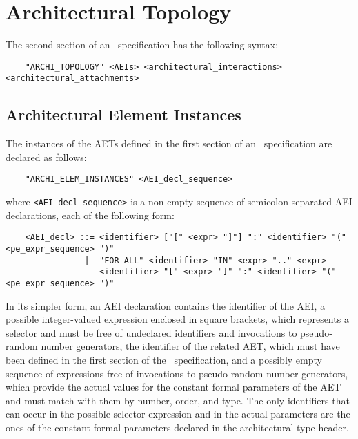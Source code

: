 \section{Architectural Topology}

The second section of an \aemilia\ specification has the following syntax:

	\begin{verbatim}
    "ARCHI_TOPOLOGY" <AEIs> <architectural_interactions> <architectural_attachments>
	\end{verbatim}


\subsection{Architectural Element Instances}

The instances of the AETs defined in the first section of an \aemilia\ specification are declared as
follows:

	\begin{verbatim}
    "ARCHI_ELEM_INSTANCES" <AEI_decl_sequence>
	\end{verbatim}

\noindent where {\tt <AEI\_decl\_sequence>} is a non-empty sequence of semicolon-separated AEI declarations,
each of the following form:

	\begin{verbatim}
    <AEI_decl> ::= <identifier> ["[" <expr> "]"] ":" <identifier> "(" <pe_expr_sequence> ")"
                |  "FOR_ALL" <identifier> "IN" <expr> ".." <expr>
                   <identifier> "[" <expr> "]" ":" <identifier> "(" <pe_expr_sequence> ")"
	\end{verbatim}

In its simpler form, an AEI declaration contains the identifier of the AEI, a possible integer-valued
expression enclosed in square brackets, which represents a selector and must be free of undeclared
identifiers and invocations to pseudo-random number generators, the identifier of the related AET, which
must have been defined in the first section of the \aemilia\ specification, and a possibly empty sequence of
expressions free of invocations to pseudo-random number generators, which provide the actual values for the
constant formal parameters of the AET and must match with them by number, order, and type. The only
identifiers that can occur in the possible selector expression and in the actual parameters are the ones of
the constant formal parameters declared in the architectural type header.

